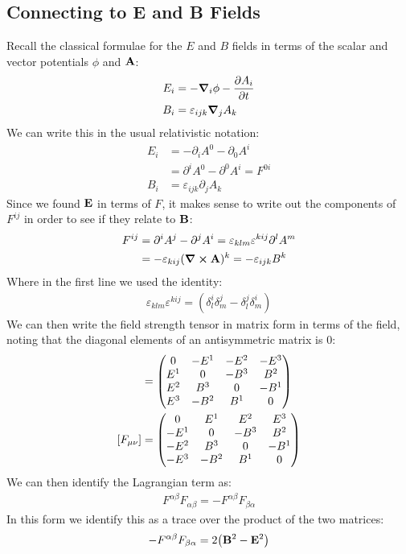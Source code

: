 \documentclass[12pt]{article}
\newcommand{\D}{\partial}
\newcommand{\veps}{\varepsilon}
\begin{document}
\subsection{Connecting to E and B Fields}
Recall the classical formulae for the $E$ and $B$ fields in terms of the scalar and vector potentials $\phi$ and $\vb{A}$:
\begin{align*}
  E_i&=-\grad_i\phi-\pdv{A_i}{t}\\
  B_i&=\veps_{ijk}\grad_jA_k
\end{align*}
We can write this in the usual relativistic notation:
\begin{align*}
  E_i&=-\D_iA^0-\D_0A^i\\
  &=\D^iA^0-\D^0A^i=F^{0i}\\
  B_i&=\veps_{ijk}\D_jA_k
\end{align*}
Since we found $\vb{E}$ in terms of $F$, it makes sense to write out the components of $F^{ij}$ in order to see if they relate to $\vb{B}$:
\begin{align*}
  F^{ij}&=\D^iA^j-\D^jA^i=\veps_{klm}\veps^{kij}\D^lA^m\\
  &=-\veps_{kij}(\curl{\vb{A}})^k=-\veps_{ijk}B^k
\end{align*}
Where in the first line we used the identity:
\begin{align*}
  \veps_{klm}\veps^{kij}=(\delta^i_l\delta^j_m-\delta^j_l\delta^i_m)
\end{align*}
We can then write the field strength tensor in matrix form in terms of the field, noting that the diagonal elements of an antisymmetric matrix is $0$:
\begin{align*}
  [F^{\mu\nu}]&=
  \pmqty{
    0  & -E^1& -E^2& -E^3\\
    E^1&  0  & -B^3&  B^2\\
    E^2&  B^3&  0  & -B^1\\
    E^3& -B^2&  B^1&  0
  }\\
  [F_{\mu\nu}]&=
  \pmqty{
     0  &  E^1&  E^2&  E^3\\
    -E^1&  0  & -B^3&  B^2\\
    -E^2&  B^3&  0  & -B^1\\
    -E^3& -B^2&  B^1&  0
  }
\end{align*}
We can then identify the Lagrangian term as:
\begin{align*}
  F^{\alpha\beta}F_{\alpha\beta}=-F^{\alpha\beta}F_{\beta\alpha}
\end{align*}
In this form we identify this as a trace over the product of the two matrices:
\begin{align*}
  -F^{\alpha\beta}F_{\beta\alpha}=2\qty(\vb{B}^2-\vb{E}^2)
\end{align*}
\end{document}
